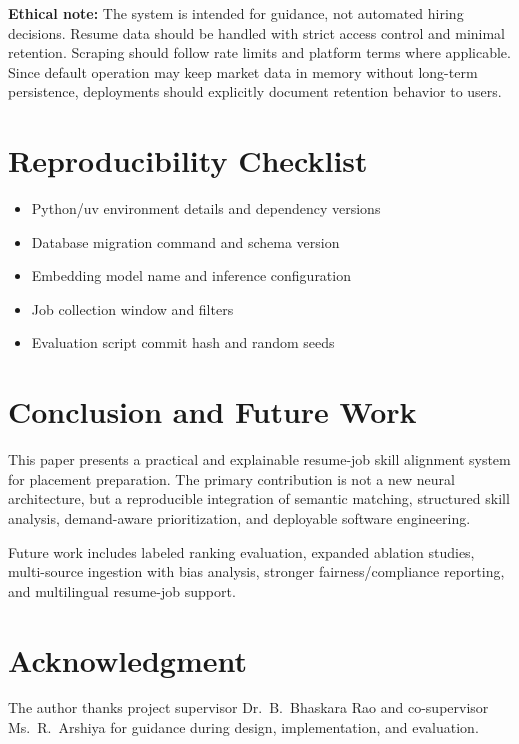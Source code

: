 \documentclass[conference]{IEEEtran}
\begin{document}
\textbf{Ethical note:} The system is intended for guidance, not automated hiring decisions. Resume data should be handled with strict access control and minimal retention. Scraping should follow rate limits and platform terms where applicable. Since default operation may keep market data in memory without long-term persistence, deployments should explicitly document retention behavior to users.

\section{Reproducibility Checklist}
\begin{itemize}
    \item Python/uv environment details and dependency versions
    \item Database migration command and schema version
    \item Embedding model name and inference configuration
    \item Job collection window and filters
    \item Evaluation script commit hash and random seeds
\end{itemize}

\section{Conclusion and Future Work}
This paper presents a practical and explainable resume-job skill alignment system for placement preparation. The primary contribution is not a new neural architecture, but a reproducible integration of semantic matching, structured skill analysis, demand-aware prioritization, and deployable software engineering.

Future work includes labeled ranking evaluation, expanded ablation studies, multi-source ingestion with bias analysis, stronger fairness/compliance reporting, and multilingual resume-job support.

\section*{Acknowledgment}
The author thanks project supervisor Dr.\ B.\ Bhaskara Rao and co-supervisor Ms.\ R.\ Arshiya for guidance during design, implementation, and evaluation.
\end{document}
